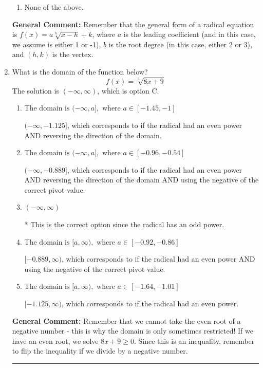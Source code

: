 \documentclass{extbook}[14pt]
\newcommand{\litem}[1]{\item #1

\rule{\textwidth}{0.4pt}}
\begin{document}
\begin{enumerate}
{\begin{enumerate}[label=\Alph*.]
\item None of the above.\end{enumerate}
\textbf{General Comment:} Remember that the general form of a radical equation is $ f(x) = a \sqrt[b]{x - h} + k $, where $a$ is the leading coefficient (and in this case, we assume is either 1 or -1), $b$ is the root degree (in this case, either 2 or 3), and $(h, k)$ is the vertex.
}
\litem{
What is the domain of the function below?
\[ f(x) = \sqrt[3]{8 x + 9} \]The solution is \( (-\infty, \infty) \), which is option C.\begin{enumerate}[label=\Alph*.]
\item \( \text{The domain is } (-\infty, a], \text{   where } a \in [-1.45, -1] \)

$(-\infty, -1.125]$, which corresponds to if the radical had an even power AND reversing the direction of the domain.
\item \( \text{The domain is } (-\infty, a], \text{   where } a \in [-0.96, -0.54] \)

$(-\infty, -0.889]$, which corresponds to if the radical had an even power AND reversing the direction of the domain AND using the negative of the correct pivot value.
\item \( (-\infty, \infty) \)

* This is the correct option since the radical has an odd power.
\item \( \text{The domain is } [a, \infty), \text{   where } a \in [-0.92, -0.86] \)

$[-0.889, \infty)$, which corresponds to if the radical had an even power AND using the negative of the correct pivot value.
\item \( \text{The domain is } [a, \infty), \text{   where } a \in [-1.64, -1.01] \)

$[-1.125, \infty)$, which corresponds to if the radical had an even power.
\end{enumerate}

\textbf{General Comment:} Remember that we cannot take the even root of a negative number - this is why the domain is only sometimes restricted! If we have an even root, we solve $8 x + 9 \geq 0$. Since this is an inequality, remember to flip the inequality if we divide by a negative number.
}
\end{enumerate}
\end{document}
